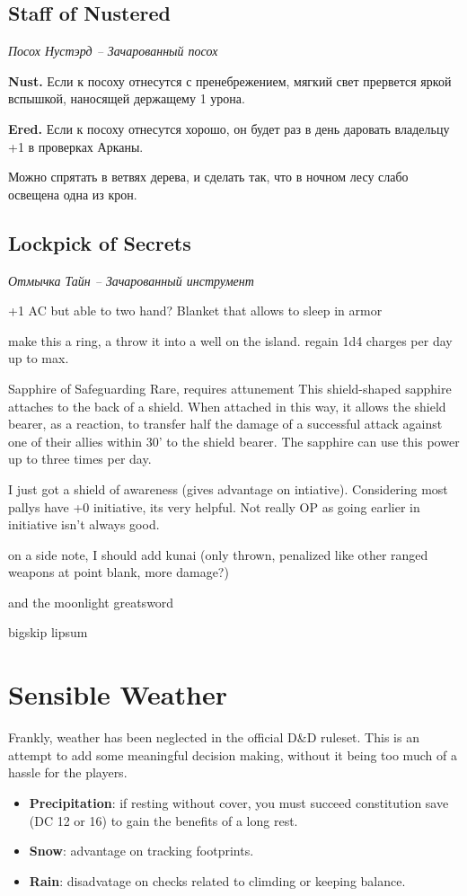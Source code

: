 \documentclass[a4paper,11pt]{book}
\newcommand{\ii}[1]
    {{
      \AlegreyaSansOsF
      \itshape
      #1}}{}
\newenvironment{Frame}{%
        \begin{tcolorbox}[%
            drop lifted shadow,
            notitle, sharp corners, colback=white!98!black,
            frame hidden,
            borderline west = {0.1pt}{0pt}{gray!10!bordercolor},
            borderline east = {0.1pt}{0pt}{gray!10!bordercolor},
            borderline north = {1pt}{0pt}{bordercolor},
            borderline south = {1pt}{0pt}{bordercolor},
            boxrule=0.5pt, boxsep=0pt, enhanced,
            fuzzy shadow={0pt}{0pt}{-0.5pt}{0.8pt}{opacity=0.005,white!30!gray}
        ]%
    }{%
        \end{tcolorbox}
    }
\newenvironment{Item}[2]
    {
     \smallskip
     \begin{Frame}
     \section{#1}
     \ii{#2}
     \smallskip \\
     \setlength{\parindent}{1.5em}
    }{
        \smallskip
        \end{Frame}
    }
\begin{document}
\begin{multicols}{2}
\begin{Item}{Staff of Nustered}{Посох Нустэрд -- Зачарованный посох}
    \textbf{Nust.} Если к посоху отнесутся с пренебрежением, мягкий свет прервется яркой вспышкой, наносящей держащему 1 урона.

    \textbf{Ered.} Если к посоху отнесутся хорошо, он будет раз в день даровать владельцу +1 в проверках Арканы.
\end{Item}

Можно спрятать в ветвях дерева, и сделать так, что в ночном лесу слабо освещена одна из крон.


\begin{Item}{Lockpick of Secrets}{Отмычка Тайн -- Зачарованный инструмент}
\end{Item}


+1 AC but able to two hand?
Blanket that allows to sleep in armor


make this a ring, a throw it into a well on the island. regain 1d4 charges per day up to max.

Sapphire of Safeguarding
Rare, requires attunement
This shield-shaped sapphire attaches to the back of a shield. When attached in this way, it allows the shield bearer, as a reaction, to transfer half the damage of a successful attack against one of their allies within 30' to the shield bearer. The sapphire can use this power up to three times per day.


I just got a shield of awareness (gives advantage on intiative). Considering most pallys have +0 initiative, its very helpful. Not really OP as going earlier in initiative isn't always good.



on a side note, I should add kunai (only thrown, penalized like other ranged weapons at point blank, more damage?)

and the moonlight greatsword

bigskip
lipsum

\chapter{Sensible Weather}

Frankly, weather has been neglected in the official D\&D ruleset. This is an attempt to add some meaningful decision making, without it being too much of a hassle for the players.

\begin{itemize}
    \item \textbf{Precipitation}: if resting without cover, you must succeed constitution save (DC 12 or 16) to gain the benefits of a long rest.
    \item \textbf{Snow}: advantage on tracking footprints.
    \item \textbf{Rain}: disadvatage on checks related to climding or keeping balance.
\end{itemize}


\end{multicols}
\end{document}
